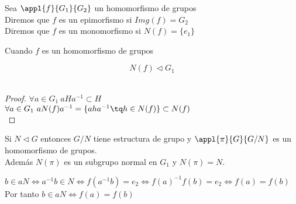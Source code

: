 \documentclass[a4paper,10pt]{apuntes}
\newenvironment{example}[1][Ejemplo]{\begin{trivlist}
\item[\hskip \labelsep {\bfseries #1}]}{\end{trivlist}}
\begin{document}
\begin{defn}
Sea $\appl{f}{G_1}{G_2}$ un homomorfismo de grupos\\
Diremos que $f$ es un epimorfismo si $Img(f) = G_2$\\
Diremos que $f$ es un monomorfismo si $N(f) = \{ e_1\} $
\end{defn}

\begin{lemma} Cuando $f$ es un homomorfismo de grupos

$$N(f) \lhd G_1$$\\
\end{lemma}

\begin{proof}
$\forall a\in G_1\ aHa^{-1}\subset H$\\
$\forall a\in G_1\ aN(f)a^{-1} = \{aha^{-1} \tq h\in N(f) \}\subset N(f)$\\
\end{proof}

\obs Si $N\lhd G$ entonces $G/N$ tiene estructura de grupo y $\appl{\pi}{G}{G/N}$ es un homomorfismo de grupos.\\ Además $N(\pi )$ es un subgrupo normal en $G_1$ y $N(\pi )=N$.

\begin{example}
$b \in aN \iff a^{-1}b\in N \iff f(a^{-1}b) = e_2 \iff f(a)^{-1}f(b)=e_2 \iff f(a) = f(b)$
Por tanto
$b\in aN \iff f(a) = f(b)$
\end{example}
\end{document}

